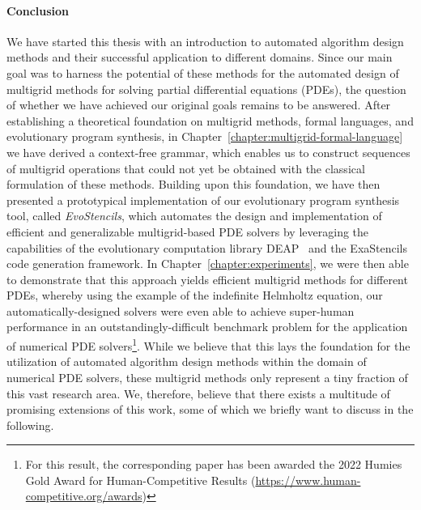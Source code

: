 \paragraph{Conclusion}
We have started this thesis with an introduction to automated algorithm design methods and their successful application to different domains.
Since our main goal was to harness the potential of these methods for the automated design of multigrid methods for solving partial differential equations (PDEs), the question of whether we have achieved our original goals remains to be answered.
After establishing a theoretical foundation on multigrid methods, formal languages, and evolutionary program synthesis, in Chapter~\ref{chapter:multigrid-formal-language} we have derived a context-free grammar, which enables us to construct sequences of multigrid operations that could not yet be obtained with the classical formulation of these methods.
Building upon this foundation, we have then presented a prototypical implementation of our evolutionary program synthesis tool, called \emph{EvoStencils}, which automates the design and implementation of efficient and generalizable multigrid-based PDE solvers by leveraging the capabilities of the evolutionary computation library DEAP~\cite{rainville2012deap} and the ExaStencils~\cite{lengauer2020exastencils} code generation framework.
In Chapter~\ref{chapter:experiments}, we were then able to demonstrate that this approach yields efficient multigrid methods for different PDEs, whereby using the example of the indefinite Helmholtz equation, our automatically-designed solvers were even able to achieve super-human performance in an outstandingly-difficult benchmark problem for the application of numerical PDE solvers\footnote{For this result, the corresponding paper has been awarded the 2022 Humies Gold Award for Human-Competitive Results (\url{https://www.human-competitive.org/awards})}.
While we believe that this lays the foundation for the utilization of automated algorithm design methods within the domain of numerical PDE solvers, these multigrid methods only represent a tiny fraction of this vast research area.
We, therefore, believe that there exists a multitude of promising extensions of this work, some of which we briefly want to discuss in the following. 
